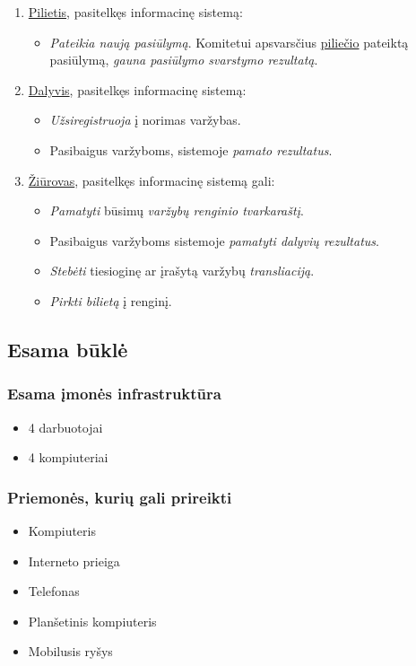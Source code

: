 \documentclass{VUMIFPSkursinis}
\begin{document}
      \begin{enumerate}
        \item \underline{Pilietis}, pasitelkęs informacinę sistemą:
          \begin{itemize}
            \item \textit{Pateikia naują pasiūlymą}. Komitetui apsvarsčius \underline{piliečio} pateiktą pasiūlymą, \textit{gauna pasiūlymo svarstymo rezultatą}.
          \end{itemize}
        \item \underline{Dalyvis}, pasitelkęs informacinę sistemą:
          \begin{itemize}
            \item \textit{Užsiregistruoja} į norimas varžybas.
            \item Pasibaigus varžyboms, sistemoje \textit{pamato rezultatus}.
          \end{itemize}
        \item \underline{Žiūrovas}, pasitelkęs informacinę sistemą gali:
          \begin{itemize}
            \item \textit{Pamatyti} būsimų \textit{varžybų renginio tvarkaraštį}.
            \item Pasibaigus varžyboms sistemoje \textit{pamatyti dalyvių rezultatus}.
            \item \textit{Stebėti} tiesioginę ar įrašytą varžybų \textit{transliaciją}.
            \item \textit{Pirkti bilietą} į renginį.
          \end{itemize}
      \end{enumerate}

  \subsection{Esama būklė} \label{sistemosNaudojimoScenarijus_esamaBukle}
    \subsubsection*{Esama įmonės infrastruktūra} \label{sistemosNaudojimoScenarijus_esamaBukle_esamaInfrastruktura}
      \begin{itemize}
        \item 4 darbuotojai
        \item 4 kompiuteriai
      \end{itemize}
    \subsubsection*{Priemonės, kurių gali prireikti} \label{sistemosNaudojimoScenarijus_esamaBukle_priemonesKuriuGaliPrireikti}
      \begin{itemize}
        \item Kompiuteris
        \item Interneto prieiga
        \item Telefonas
        \item Planšetinis kompiuteris
        \item Mobilusis ryšys
      \end{itemize}	
\end{document}
